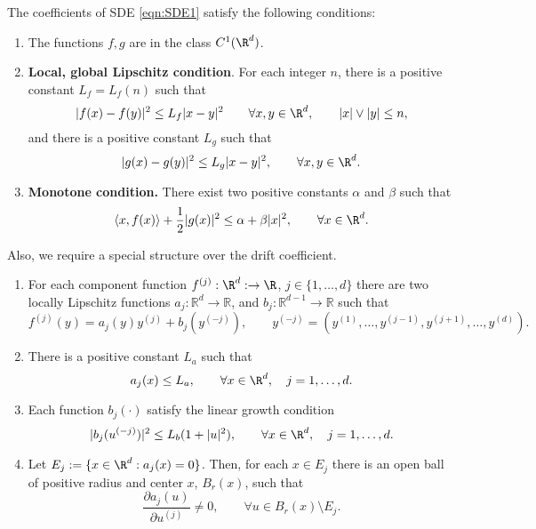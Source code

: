 \begin{hypothesis}\label{ass:OSLC}
	The coefficients of SDE \eqref{eqn:SDE1} satisfy the following conditions:
	\begin{enumerate}[({H}-1)]
		\item \label{ass:C1Functions}
			The functions $f,g$ are in the class $C^{1}(\R^d)$.
		\item
			\textbf{Local, global Lipschitz condition}. For each integer $n$, there is a positive
			constant $L_{f}=L_{f}(n)$ such that
			$$
				|f(x)-f(y)|^2 %
				\leq L_{f}|x-y|^2 \qquad \forall x,y \in \R^d, \qquad |x|\vee|y|\leq n,
			$$
			and there is a positive constant $L_g$ such that
			$$
				|g(x)-g(y)|^2 \leq L_{g}|x-y|^2,
				\qquad  \forall x,y \in \R^d.
			$$ 
		\item\label{ass:MonotoneCondition}
			\textbf{Monotone condition.} There exist two positive constants $\alpha$ and $\beta$
			such that
			\begin{equation}\label{eqn:MonotoneCondition}
				\innerprod{x}{f(x)} +\frac{1}{2}|g(x)|^2
				\leq \alpha +\beta |x|^2, \qquad \forall x \in \R^d.
			\end{equation}
	\end{enumerate}
\end{hypothesis}
%
\begin{hypothesis}\label{ass:ajBound} %
	Also, we require a special structure over the drift coefficient.
	\begin{enumerate}[({A}-1)]
		\item\label{ass:FunctionStructure}
			For each component function $f^{(j)}:\R^d:\to \R$, %
			$j \in \{1,\dots, d\}$
		there are two locally Lipschitz functions $a_j:\mathbb{R}^{d} \to \mathbb{R}$, and
		$b_{j}:\mathbb{R}^{d-1} \to \mathbb{R}$ such that 
		\begin{equation}\label{eqn:AlternativeConstruction}
			f^{(j)}(y) = a_j (y) y^{(j)} + b_{j}(y^{(-j)}), \qquad
			y^{(-j)} = (y^{(1)}, \dots ,y^{(j-1)}, y^{(j+1)}, \dots, y^{(d)}).
		\end{equation}
		\item
			There is a positive constant $L_a$ such that
			\begin{equation}
				a_{j}(x) \leq L_a, \qquad \forall x\in \R^d, \quad j=1,\ldots, d.
			\end{equation}
		\item Each function $b_j(\cdot)$ satisfy the linear growth condition
			\begin{equation}\label{eqn:bjLinearGrowthCondition}
				|b_j(u^{(-j)})|^2 \leq L_{b}(1+|u|^2) , \qquad \forall x\in \R^d, \quad j=1,\ldots, d.
			\end{equation}
		\item
			Let $E_j:=\{x\in \R^d: a_j(x)=0\}$. Then, for each $x\in E_j$ there is an open ball of positive 
			radius and center $x$, $B_r(x)$, such that 
			$$
				\frac{\partial a_j(u)}{\partial u^{(j)}}
				\neq 0, \qquad \forall u \in B_r(x) \setminus E_j.
			$$
	\end{enumerate}
\end{hypothesis}
